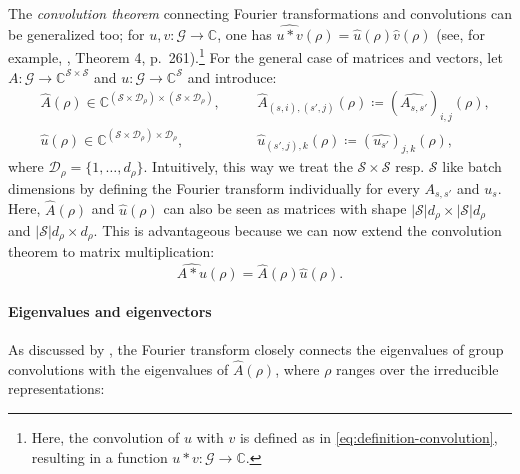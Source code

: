 \documentclass[preprint,12pt,authoryear]{elsarticle}
\newcommand{\C}{\mathbb{C}}
\newcommand{\Fourier}[1]{\widehat{#1}}
\newcommand\Gc{\mathcal G}
\newcommand\Sc{\mathcal S}
\newcommand\Dc{\mathcal D}
\begin{document}
{The \emph{convolution theorem} connecting Fourier transformations and convolutions can be generalized too; for $u, v:  \Gc\rightarrow \C$, one has
$
    \Fourier{u * v}(\rho) = \Fourier{u}(\rho) \Fourier{v}(\rho)
$
(see, for example, \cite{terras1999fourier}, Theorem 4, p.\ 261).\footnote{Here, the convolution of $u$ with $v$ is defined as in \eqref{eq:definition-convolution}, resulting in a function $u * v : \Gc \rightarrow \C$.}
For the general case of matrices and vectors, let $A : \Gc \rightarrow \C^{\Sc \times \Sc}$ and $u : \Gc\rightarrow \C^\Sc$ and introduce:
\begin{align*}
    &\Fourier{A}(\rho) \in \C^{(\Sc \times \Dc_\rho) \times (\Sc \times \Dc_\rho)},
    \quad &&\Fourier{A}_{(s,i),(s',j)}(\rho) \coloneqq (\Fourier{A_{s,s'}})_{i,j}(\rho), \\
    &\Fourier{u}(\rho) \in \C^{(\Sc \times \Dc_\rho) \times \Dc_\rho}, 
    \quad &&\Fourier{u}_{(s',j), k}(\rho) \coloneqq (\Fourier{u_{s'}})_{j,k}(\rho),
\end{align*}
where $\Dc_\rho = \{1,\dots,d_\rho\}$. 
Intuitively, this way we treat the $\Sc \times \Sc$ resp. $\Sc$ like batch dimensions by defining the Fourier transform individually for every $A_{s,s'}$ and $u_s$. 
Here, 
$\Fourier{A}(\rho)$ and $\Fourier{u}(\rho)$ can also be seen as matrices with shape $|\Sc|d_\rho \times |\Sc|d_\rho$ and $|\Sc| d_\rho \times d_\rho$. 
This is advantageous because we can now extend the convolution theorem to matrix multiplication:
\begin{equation}
    \Fourier{A * u}(\rho) = \Fourier{A}(\rho) \Fourier{u}(\rho). \label{eq:convolution-theorem}
\end{equation}

\paragraph{Eigenvalues and eigenvectors}
As discussed by \cite{ahlander_eigenvalues_2006}, the Fourier transform closely connects the eigenvalues of group convolutions with the eigenvalues of $\Fourier{A}(\rho)$, where $\rho$ ranges over the irreducible representations:

}
\end{document}
